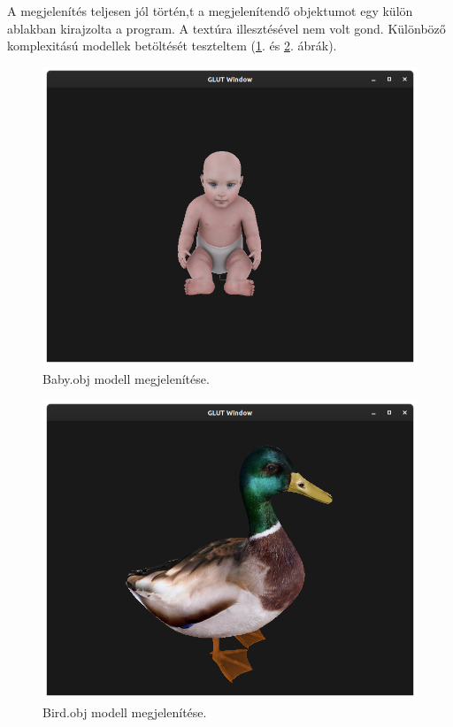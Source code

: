 A megjelenítés teljesen jól történ,t a megjelenítendő objektumot egy külön ablakban kirajzolta a program. A textúra illesztésével nem volt gond.
\newpage
Különböző komplexitású modellek betöltését teszteltem (\ref{fig:modelbaby}. és  \ref{fig:modelbird}. ábrák).

\begin{figure}[h]
\centering
\includegraphics[scale=0.35]{images/model1.png}
\caption{Baby.obj modell megjelenítése.}
\label{fig:modelbaby}
\end{figure}

\begin{figure}[h]
\centering
\includegraphics[scale=0.35]{images/bird.png}
\caption{Bird.obj modell megjelenítése.}
\label{fig:modelbird}
\end{figure}

